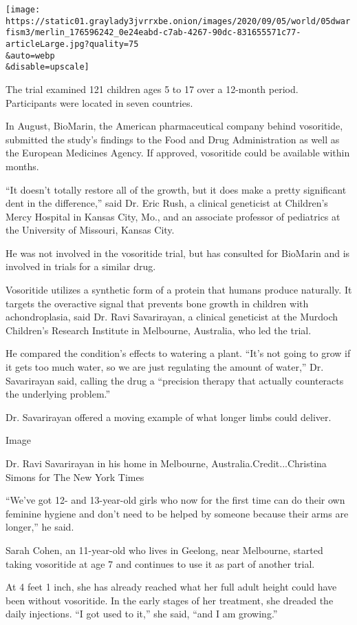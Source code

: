 \texttt{[image: https://static01.graylady3jvrrxbe.onion/images/2020/09/05/world/05dwarfism3/merlin\_176596242\_0e24eabd-c7ab-4267-90dc-831655571c77-articleLarge.jpg?quality=75\\\&auto=webp\\\&disable=upscale]}

The trial examined 121 children ages 5 to 17 over a 12-month period.
Participants were located in seven countries.

In August, BioMarin, the American pharmaceutical company behind
vosoritide, submitted the study's findings to the Food and Drug
Administration as well as the European Medicines Agency. If approved,
vosoritide could be available within months.

``It doesn't totally restore all of the growth, but it does make a
pretty significant dent in the difference,'' said Dr. Eric Rush, a
clinical geneticist at Children's Mercy Hospital in Kansas City, Mo.,
and an associate professor of pediatrics at the University of Missouri,
Kansas City.

He was not involved in the vosoritide trial, but has consulted for
BioMarin and is involved in trials for a similar drug.

Vosoritide utilizes a synthetic form of a protein that humans produce
naturally. It targets the overactive signal that prevents bone growth in
children with achondroplasia, said Dr. Ravi Savarirayan, a clinical
geneticist at the Murdoch Children's Research Institute in Melbourne,
Australia, who led the trial.

He compared the condition's effects to watering a plant. ``It's not
going to grow if it gets too much water, so we are just regulating the
amount of water,'' Dr. Savarirayan said, calling the drug a ``precision
therapy that actually counteracts the underlying problem.''

Dr. Savarirayan offered a moving example of what longer limbs could
deliver.

Image

Dr. Ravi Savarirayan in his home in Melbourne,
Australia.Credit...Christina Simons for The New York Times

``We've got 12- and 13-year-old girls who now for the first time can do
their own feminine hygiene and don't need to be helped by someone
because their arms are longer,'' he said.

Sarah Cohen, an 11-year-old who lives in Geelong, near Melbourne,
started taking vosoritide at age 7 and continues to use it as part of
another trial.

At 4 feet 1 inch, she has already reached what her full adult height
could have been without vosoritide. In the early stages of her
treatment, she dreaded the daily injections. ``I got used to it,'' she
said, ``and I am growing.''

